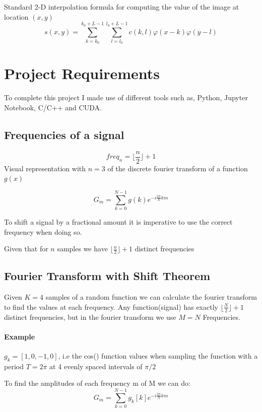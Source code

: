 \documentclass[]{usiinfbachelorproject}
\begin{document}
	Standard 2-D interpolation formula for computing the value of the image at location $(x,y)$
	\begin{equation}
		s(x,y) = \sum_{k = k_0}^{k_0+L-1}\sum_{l=l_0}^{l_0+L-1} c(k,l)\varphi(x-k)\varphi(y-l)
	\end{equation}
	
	\fi
	

	\section{Project Requirements}
	To complete this project I made use of different tools such as, Python, Jupyter Notebook, C/C++ and CUDA.
	
	
	
	\subsection{Frequencies of a signal}
	\begin{equation}
		freq_{n} = \lfloor \frac{n}{2} \rfloor + 1
	\end{equation}
	Visual representation with $n=3$ of the discrete fourier transform of a function $g(x)$
	
	\begin{equation*}
		G_m = \displaystyle\sum_{k=0}^{N-1}g(k)e^{-i \frac{2\pi}{N}km}
	\end{equation*}
	
	To shift a signal by a fractional amount it is imperative to use the correct frequency when doing so.
	
	Given that for $n$ samples we have $\lfloor \frac{n}{2} \rfloor + 1$ distinct frequencies
	
	
	\subsection{Fourier Transform with Shift Theorem}
	Given $K=4$ samples of a random function we can calculate the fourier transform to find the values at each frequency.
	Any function(signal) has exactly $\lfloor \frac{N}{2}\rfloor+1$ distinct frequencies, but in the fourier transform we use $M=N$ Frequencies.
	\paragraph{Example}
	$g_k = [1,0,-1,0]$, i.e the cos() function values when sampling the function with a period $T=2\pi$ at 4 evenly spaced intervals of $\pi/2$
	
	To find the amplitudes of each frequency m of M we can do:
	\begin{equation}
		G_m = \displaystyle\sum_{k=0}^{N-1}g_k[k]e^{-i \frac{2\pi}{N} km}
	\end{equation}
	
\end{document}
